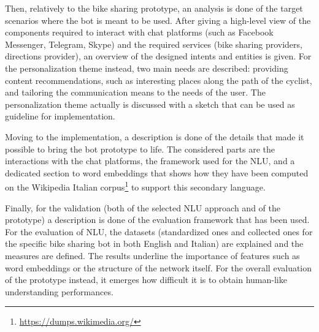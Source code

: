 Then, relatively to the bike sharing prototype, an analysis is done of the target scenarios where the bot is meant to be used. After giving a high-level view of the components required to interact with chat platforms (such as Facebook Messenger, Telegram, Skype) and the required services (bike sharing providers, directions provider), an overview of the designed intents and entities is given. For the personalization theme instead, two main needs are described: providing content recommendations, such as interesting places along the path of the cyclist, and tailoring the communication means to the needs of the user. The personalization theme actually is discussed with a sketch that can be used as guideline for implementation.

Moving to the implementation, a description is done of the details that made it possible to bring the bot prototype to life. The considered parts are the interactions with the chat platforms, the framework used for the NLU, and a dedicated section to word embeddings that shows how they have been computed on the Wikipedia Italian corpus\footnote{\url{https://dumps.wikimedia.org/}} to support this secondary language.

Finally, for the validation (both of the selected NLU approach and of the prototype) a description is done of the evaluation framework that has been used. For the evaluation of NLU, the datasets (standardized ones and collected ones for the specific bike sharing bot in both English and Italian) are explained and the measures are defined. The results underline the importance of features such as word embeddings or the structure of the network itself. For the overall evaluation of the prototype instead, it emerges how difficult it is to obtain human-like understanding performances.


